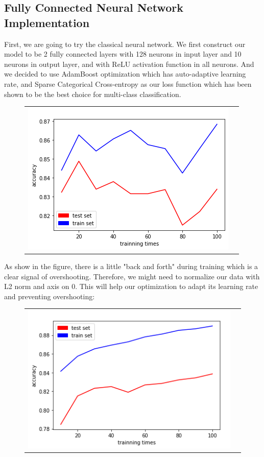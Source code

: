\documentclass[12pt]{article}
\begin{document}
\subsection{Fully Connected Neural Network Implementation}
First, we are going to try the classical neural network. We first construct our model to be 2 fully connected layers with 128 neurons in input layer and 10 neurons in output layer, and with ReLU activation function in all neurons. And we decided to use AdamBoost optimization which has auto-adaptive learning rate, and Sparse Categorical Cross-entropy as our loss function which has been shown to be the best choice for multi-class classification.
\begin{figure}[H]
\begin{tabular}{cc}
  \includegraphics[width=\textwidth]{nn-1.png}
\end{tabular}
\end{figure}
As show in the figure, there is a little "back and forth" during training which is a clear signal of overshooting. Therefore, we might need to normalize our data with L2 norm and axis on 0. This will help our optimization to adapt its learning rate and preventing overshooting:
\begin{figure}[H]
\begin{tabular}{cc}
  \includegraphics[width=\textwidth]{nn-3.png}
\end{tabular}
\end{figure}
\end{document}
